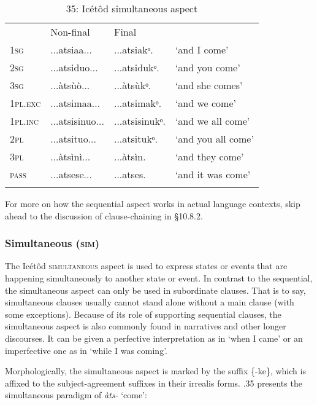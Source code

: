 \begin{table}
\begin{table}
\caption{34: Icétôd sequential aspect}
\label{tab:8}


\begin{tabularx}{\textwidth}{XXXX} & Non-final & Final & \\
\lsptoprule
\textsc{1sg} & ...atsiaa... & ...atsiakᵒ. & ‘and I come’\\
\textsc{2sg} & ...atsiduo... & ...atsidukᵒ. & ‘and you come’\\
\textsc{3sg} & ...àtsùò... & ...àtsùkᵒ. & ‘and she comes’\\
\textsc{1pl.exc} & ...atsimaa... & ...atsimakᵒ. & ‘and we come’\\
\textsc{1pl.inc} & ...atsisinuo... & ...atsisinukᵒ. & ‘and we all come’\\
\textsc{2pl} & ...atsituo... & ...atsitukᵒ. & ‘and you all come’\\
\textsc{3pl} & ...àtsìnì... & ...àtsìn. & ‘and they come’\\
\textsc{pass} & ...atsese... & ...atses. & ‘and it was come’\\
\lspbottomrule
\end{tabularx}
\end{table}
For more on how the sequential aspect works in actual language contexts, skip ahead to the discussion of clause-chaining in §10.8.2.


\subsubsection{Simultaneous (\textsc{sim})}

The Icétôd \textsc{simultaneous} aspect is used to express states or events that are happening simultaneously to another state or event. In contrast to the sequential, the simultaneous aspect can only be used in subordinate clauses. That is to say, simultaneous clauses usually cannot stand alone without a main clause (with some exceptions). Because of its role of supporting sequential clauses, the simultaneous aspect is also commonly found in narratives and other longer discourses. It can be given a perfective interpretation as in ‘when I came’ or an imperfective one as in ‘while I was coming’.

Morphologically, the simultaneous aspect is marked by the suffix \{-ke\}, which is affixed to the subject-agreement suffixes in their irrealis forms. .35 presents the simultaneous paradigm of \textit{àts- }‘come’:


\begin{table}
\caption{35: Icétôd simultaneous aspect}
\label{tab:8}



\end{table}
\end{table}
